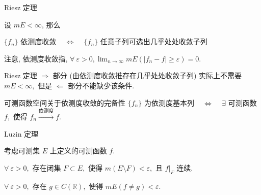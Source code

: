 
\begin{frame}{Riesz 定理}

\begin{thm}[Riesz 定理]
设 \alert{$m E < \infty$}, 那么
\begin{center}
$\{ f_n \}$ \alert{依测度}收敛 ~ $\Longleftrightarrow$ ~ $\{ f_n \}$ 任意子列可选出几乎处处收敛子列
\end{center}
\pause
\alert{注意}, 依测度收敛指, $\displaystyle \forall ~ \varepsilon > 0, \lim_{n\to\infty} m E(|f_n - f| \geqslant \varepsilon) = 0.$
\end{thm}

\pause
\vspace{1em}

\begin{attnblock}
Riesz 定理 $\Longrightarrow$ 部分 (由依测度收敛推存在几乎处处收敛子列) 实际上不需要 $m E < \infty,$ 但是 $\Longleftarrow$ 部分不能缺少该条件.
\end{attnblock}

\pause
\vspace{1em}

\begin{block}{可测函数空间关于依测度收敛的完备性}
$\{ f_n \}$ 为依测度基本列 ~ $\Longleftrightarrow$ ~ \pause
$\exists$ 可测函数 $f,$ 使得 $f_n \xrightarrow{\text{依测度}} f.$
\end{block}

\end{frame}


\begin{frame}{Luzin 定理}

考虑可测集 $E$ 上定义的可测函数 $f.$

\begin{thm}[Luzin 定理 | 形式1]
$\forall ~ \varepsilon > 0,$ 存在闭集 $F \subset E,$ 使得 $m (E \setminus F) < \varepsilon,$ 且 $f|_F$ 连续.
\end{thm}

\pause
\vspace{1em}

\begin{thm}[Luzin 定理 | 形式2]
$\forall ~ \varepsilon > 0,$ 存在 $g \in C(\mathbb{R}),$ 使得 $m E(f \neq g) < \varepsilon.$
\end{thm}

\end{frame}

